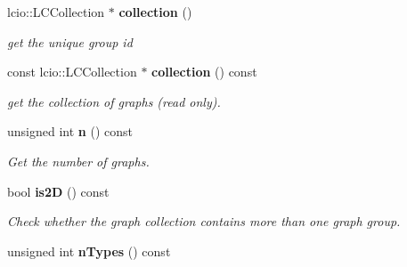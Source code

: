 \begin{DoxyCompactItemize}
\item 
lcio\-::\-L\-C\-Collection $\ast$ {\bf collection} ()
\begin{DoxyCompactList}\small\item\em get the unique group id \end{DoxyCompactList}\item 
const lcio\-::\-L\-C\-Collection $\ast$ {\bf collection} () const 
\begin{DoxyCompactList}\small\item\em get the collection of graphs (read only). \end{DoxyCompactList}\item 
unsigned int {\bf n} () const 
\begin{DoxyCompactList}\small\item\em Get the number of graphs. \end{DoxyCompactList}\item 
bool {\bf is2\-D} () const 
\begin{DoxyCompactList}\small\item\em Check whether the graph collection contains more than one graph group. \end{DoxyCompactList}\item 
unsigned int {\bfseries n\-Types} () const \label{classhistmgr_1_1GraphCollection__t_aa2092b41bf92f55d260e754ff26e48f2}


\end{DoxyCompactItemize}
